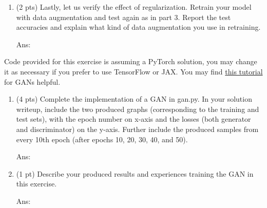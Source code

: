 \documentclass[10pt,letterpaper]{article}
\newcommand{\magenta}[1]{{\color{magenta}#1}}
\newcommand{\ans}[1]{{\color{orange}\textsf{Ans}: #1}}
\begin{document}
\begin{exercise}
\begin{enumerate}[label=\alph*)]
\begin{enumerate}[label=(\roman*)]
			As one resource for those working in PyTorch, you can read this \href{https://pytorch.org/vision/stable/transforms.html}{\magenta{doc}} to learn how to build a complex transformation pipeline. We suggest the following command for performing flipping: 
			\begin{verbatim}
			torchvision.transforms.RandomHorizontalFlip(p=1)
			torchvision.transforms.RandomVerticalFlip(p=1)
			\end{verbatim}
			
			\ans{}
			
			\item (1 pt) test accuracy vs Gaussian noise. Try adding standard Gaussian noise to each test image with variance 0.01, 0.1, 1 and report the test accuracies. What is the effect? Please explain the effect in one sentence.
			
			Again for those working in PyTorch, one way of approaching this is to apply a user-defined lambda as a new transform t which adds Gaussian noise with variance say 0.01: 
			\begin{verbatim}
			t = torchvision.transforms.Lambda(lambda x : x + 0.1*torch.randn_like(x))
			\end{verbatim}
			
			\ans{}
		\end{enumerate} 
		
		\item (2 pts) Lastly, let us verify the effect of regularization. Retrain your model with data augmentation and test again as in part 3. Report the test accuracies and explain what kind of data augmentation you use in retraining.
		
		\ans{}
		
	\end{enumerate}
	
\end{exercise}

\begin{exercise}
  Code provided for this exercise is assuming a PyTorch solution, you may change it as necessary if you prefer to use TensorFlow or JAX.
  You may find \href{https://pytorch.org/tutorials/beginner/dcgan_faces_tutorial.html}{this tutorial} for GANs helpful. 
  \begin{enumerate}[label=\alph*]
    \item (4 pts) Complete the implementation of a GAN in gan.py. 
      In your solution writeup, include the two produced graphs (corresponding to the training and test sets), with the epoch number on x-axis and the losses (both generator and discriminator) on the y-axis.
      Further include the produced samples from every 10th epoch (after epochs 10, 20, 30, 40, and 50).


      \ans{} 
    \item (1 pt) Describe your produced results and experiences training the GAN in this exercise.

      \ans{} 
  \end{enumerate}

\end{exercise}
\end{document}
